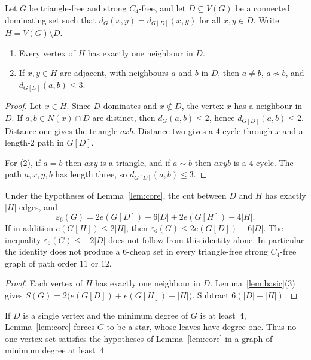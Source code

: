 \begin{lemma}\label{lem:core}
Let $G$ be triangle-free and strong $C_4$-free, and let $D\subseteq V(G)$ be a connected dominating set such that $d_G(x,y)=d_{G[D]}(x,y)$ for all $x,y\in D$. Write $H=V(G)\setminus D$.
\begin{enumerate}
\item Every vertex of $H$ has exactly one neighbour in $D$.
\item If $x,y\in H$ are adjacent, with neighbours $a$ and $b$ in $D$, then $a\ne b$, $a\not\sim b$, and $d_{G[D]}(a,b)\le 3$.
\end{enumerate}
\end{lemma}

\begin{proof}
Let $x\in H$. Since $D$ dominates and $x\notin D$, the vertex $x$ has a neighbour in $D$. If $a,b\in N(x)\cap D$ are distinct, then $d_G(a,b)\le 2$, hence $d_{G[D]}(a,b)\le 2$. Distance one gives the triangle $axb$. Distance two gives a $4$-cycle through $x$ and a length-$2$ path in $G[D]$.

For (2), if $a=b$ then $axy$ is a triangle, and if $a\sim b$ then $axyb$ is a $4$-cycle. The path $a,x,y,b$ has length three, so $d_{G[D]}(a,b)\le 3$.
\end{proof}

\begin{lemma}\label{lem:coreid}
Under the hypotheses of Lemma~\ref{lem:core}, the cut between $D$ and $H$ has exactly $|H|$ edges, and
\[
\varepsilon_6(G)=2e(G[D])-6|D|+2e(G[H])-4|H|.
\]
If in addition $e(G[H])\le 2|H|$, then $\varepsilon_6(G)\le 2e(G[D])-6|D|$. The inequality $\varepsilon_6(G)\le -2|D|$ does not follow from this identity alone. In particular the identity does not produce a $6$-cheap set in every triangle-free strong $C_4$-free graph of path order $11$ or $12$.
\end{lemma}

\begin{proof}
Each vertex of $H$ has exactly one neighbour in $D$. Lemma~\ref{lem:basic}(3) gives $S(G)=2\bigl(e(G[D])+e(G[H])+|H|\bigr)$. Subtract $6(|D|+|H|)$.
\end{proof}

If $D$ is a single vertex and the minimum degree of $G$ is at least~$4$, Lemma~\ref{lem:core} forces $G$ to be a star, whose leaves have degree one. Thus no one-vertex set satisfies the hypotheses of Lemma~\ref{lem:core} in a graph of minimum degree at least~$4$.

